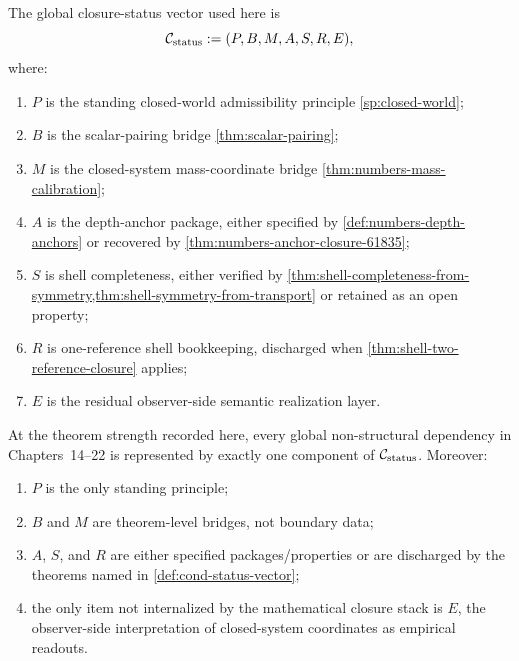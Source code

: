\begin{definition}
\label{def:cond-status-vector}
The global closure-status vector used here is
\[
  \mathcal C_{\rm status}
  :=
  (P, B, M, A, S, R, E),
\]
where:
\begin{enumerate}[label=\textup{(\roman*)}]
\item \(P\) is the standing closed-world admissibility principle
      \cref{sp:closed-world};
\item \(B\) is the scalar-pairing bridge
      \cref{thm:scalar-pairing};
\item \(M\) is the closed-system mass-coordinate bridge
      \cref{thm:numbers-mass-calibration};
\item \(A\) is the depth-anchor package, either specified by
      \cref{def:numbers-depth-anchors} or recovered by
      \cref{thm:numbers-anchor-closure-61835};
\item \(S\) is shell completeness, either verified by
      \cref{thm:shell-completeness-from-symmetry,thm:shell-symmetry-from-transport}
      or retained as an open property;
\item \(R\) is one-reference shell bookkeeping, discharged when
      \cref{thm:shell-two-reference-closure} applies;
\item \(E\) is the residual observer-side semantic realization layer.
\end{enumerate}
\end{definition}

\begin{theorem}
\label{thm:cond-closure-normal-form}
At the theorem strength recorded here, every global non-structural dependency in
Chapters~14--22 is represented by exactly one component of
\(\mathcal C_{\rm status}\).  Moreover:
\begin{enumerate}[label=\textup{(\roman*)}]
\item \(P\) is the only standing principle;
\item \(B\) and \(M\) are theorem-level bridges, not boundary data;
\item \(A\), \(S\), and \(R\) are either specified packages/properties or are
      discharged by the theorems named in \cref{def:cond-status-vector};
\item the only item not internalized by the mathematical closure stack is
      \(E\), the observer-side interpretation of closed-system coordinates as
      empirical readouts.
\end{enumerate}
\end{theorem}

